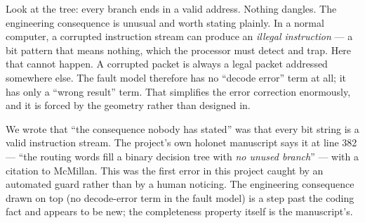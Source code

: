 \begin{center}
\end{center}

\begin{plain}
Look at the tree: every branch ends in a valid address. Nothing dangles.
The engineering consequence is unusual and worth stating plainly. In a normal computer, a
corrupted instruction stream can produce an \emph{illegal instruction} --- a bit pattern
that means nothing, which the processor must detect and trap. Here that cannot happen. A
corrupted packet is always a legal packet addressed somewhere else. The fault model
therefore has no ``decode error'' term at all; it has only a ``wrong result'' term. That
simplifies the error correction enormously, and it is forced by the geometry rather than
designed in.
\end{plain}

\begin{gotwrong}
We wrote that ``the consequence nobody has stated'' was that every bit string is a valid
instruction stream. The project's own holonet manuscript says it at line 382 --- ``the
routing words fill a binary decision tree with \emph{no unused branch}'' --- with a
citation to McMillan. This was the first error in this project caught by an automated
guard rather than by a human noticing. The engineering consequence drawn on top (no
decode-error term in the fault model) is a step past the coding fact and appears to be
new; the completeness property itself is the manuscript's.
\end{gotwrong}

